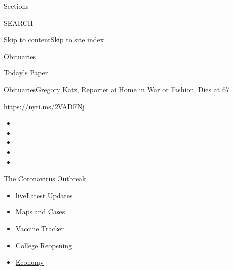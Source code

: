 Sections

SEARCH

\protect\hyperlink{site-content}{Skip to
content}\protect\hyperlink{site-index}{Skip to site index}

\href{https://www.nytimes3xbfgragh.onion/section/obituaries}{Obituaries}

\href{https://myaccount.nytimes3xbfgragh.onion/auth/login?response_type=cookie\&client_id=vi}{}

\href{https://www.nytimes3xbfgragh.onion/section/todayspaper}{Today's
Paper}

\href{/section/obituaries}{Obituaries}\textbar{}Gregory Katz, Reporter
at Home in War or Fashion, Dies at 67

\url{https://nyti.ms/2VADFNj}

\begin{itemize}
\item
\item
\item
\item
\item
\end{itemize}

\href{https://www.nytimes3xbfgragh.onion/news-event/coronavirus?action=click\&pgtype=Article\&state=default\&region=TOP_BANNER\&context=storylines_menu}{The
Coronavirus Outbreak}

\begin{itemize}
\tightlist
\item
  live\href{https://www.nytimes3xbfgragh.onion/2020/08/04/world/coronavirus-covid-19.html?action=click\&pgtype=Article\&state=default\&region=TOP_BANNER\&context=storylines_menu}{Latest
  Updates}
\item
  \href{https://www.nytimes3xbfgragh.onion/interactive/2020/us/coronavirus-us-cases.html?action=click\&pgtype=Article\&state=default\&region=TOP_BANNER\&context=storylines_menu}{Maps
  and Cases}
\item
  \href{https://www.nytimes3xbfgragh.onion/interactive/2020/science/coronavirus-vaccine-tracker.html?action=click\&pgtype=Article\&state=default\&region=TOP_BANNER\&context=storylines_menu}{Vaccine
  Tracker}
\item
  \href{https://www.nytimes3xbfgragh.onion/2020/08/02/us/covid-college-reopening.html?action=click\&pgtype=Article\&state=default\&region=TOP_BANNER\&context=storylines_menu}{College
  Reopening}
\item
  \href{https://www.nytimes3xbfgragh.onion/live/2020/08/03/business/stock-market-today-coronavirus?action=click\&pgtype=Article\&state=default\&region=TOP_BANNER\&context=storylines_menu}{Economy}
\end{itemize}

